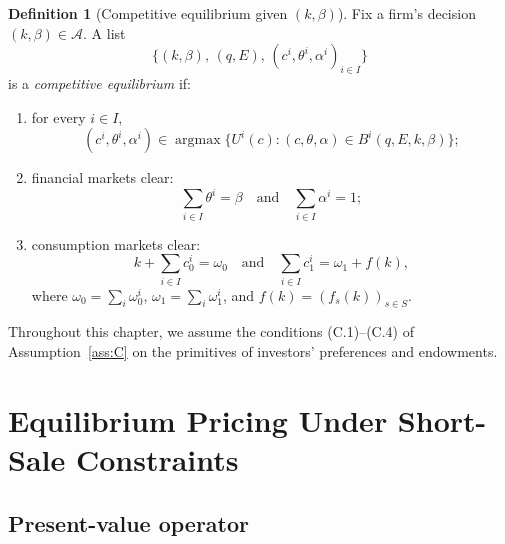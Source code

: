 \documentclass[11pt,a4paper,oneside]{book}
\def\et{\quad \text{and} \quad}
\DeclareMathOperator*{\argmax}{argmax}
\theoremstyle{plain}
\theoremstyle{definition}
\newtheorem{definition}[theorem]{Definition}
\theoremstyle{remark}
\numberwithin{equation}{chapter}
\begin{document}
\begin{definition}[Competitive equilibrium given $(k, \beta)$]\label{def:eq-BGR}
Fix a firm's decision $(k, \beta) \in \mathcal{A}$.
A list
\begin{equation*}
  \bigl\{ (k, \beta), \, (q, E), \, (c^i, \theta^i, \alpha^i)_{i \in I} \bigr\}
\end{equation*}
is a \emph{competitive equilibrium} if:
\begin{enumerate}
  \item[(a)] for every $i \in I$,
  \begin{equation*}
    (c^i, \theta^i, \alpha^i) \in \argmax \bigl\{ U^i(c) \colon (c, \theta, \alpha) \in B^i(q, E, k, \beta) \bigr\};
  \end{equation*}
  \item[(b)] financial markets clear:
  \begin{equation*}
    \sum_{i \in I} \theta^i = \beta
    \et
    \sum_{i \in I} \alpha^i = 1;
  \end{equation*}
  \item[(c)] consumption markets clear:
  \begin{equation*}
    k + \sum_{i \in I} c^i_0 = \omega_0
    \et
    \sum_{i \in I} c^i_1 = \omega_1 + f(k),
  \end{equation*}
  where $\omega_0 = \sum_i \omega^i_0$, $\omega_1 = \sum_i \omega^i_1$, and $f(k) = (f_s(k))_{s \in S}$.
\end{enumerate}
\end{definition}

Throughout this chapter, we assume the conditions (C.1)--(C.4) of Assumption~\ref{ass:C} on the primitives of investors' preferences and endowments.

\section{Equilibrium Pricing Under Short-Sale Constraints}
\label{sec:bgr-pricing}

\subsection{Present-value operator}
\end{document}
